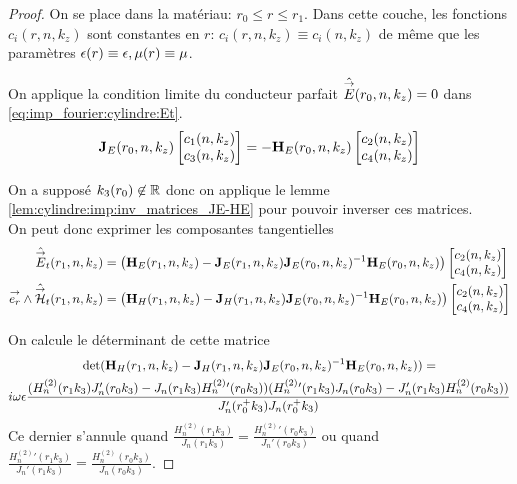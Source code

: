     \begin{proof}
      On se place dans la matériau: \(r_0 \le r \le r_ 1 \). Dans cette couche, les fonctions \(c_i(r,n,k_z)\) sont constantes en \(r\): \(c_i(r,n,k_z) \equiv c_i(n,k_z)\) de même que les paramètres \(\epsilon(r)\equiv \epsilon, \mu(r)\equiv \mu\).

      On applique la condition limite du conducteur parfait \(\hat {{\overset{\rightarrow}{E}}}(r_0,n,k_z) = 0\) dans \eqref{eq:imp_fourier:cylindre:Et}.
      \begin{equation*}
        \mathbf{J}_{E}(r_0,n,k_z)
        \begin{bmatrix}
          c_1(n,k_z) \\
          c_3(n,k_z)
        \end{bmatrix}
        =-\mathbf{H}_{E}(r_0,n,k_z)
        \begin{bmatrix}
          c_2(n,k_z) \\
          c_4(n,k_z)
        \end{bmatrix}
      \end{equation*}

      On a supposé \(k_3(r_0)\not \in \mathbb R \) donc on applique le lemme \ref{lem:cylindre:imp:inv_matrices_JE-HE} pour pouvoir inverser ces matrices.\\

      On peut donc exprimer les composantes tangentielles%
      \begin{align*}
        \hat {{\overset{\rightarrow}{E}}}_t(r_1,n,k_z) &=
        \left(\mathbf{H}_{E}(r_1,n,k_z) - \mathbf{J}_{E}(r_1,n,k_z)\mathbf{J}_{E}(r_0,n,k_z)^{-1}\mathbf{H}_{E}(r_0,n,k_z)\right)
        \begin{bmatrix}
          c_2(n,k_z) \\
          c_4(n,k_z)
        \end{bmatrix}
        \\
        {\overset{\rightarrow}{e_r}}\wedge \hat {{\overset{\rightarrow}{\mathcal{H}}}}_t(r_1,n,k_z) &=
        \left(\mathbf{H}_{H}(r_1,n,k_z) - \mathbf{J}_{H}(r_1,n,k_z)\mathbf{J}_{E}(r_0,n,k_z)^{-1}\mathbf{H}_{E}(r_0,n,k_z) \right)
        \begin{bmatrix}
          c_2(n,k_z) \\
          c_4(n,k_z)
        \end{bmatrix}
      \end{align*}

      On calcule le déterminant de cette matrice 
      \begin{multline*}
        \det(\mathbf{H}_{H}(r_1,n,k_z) - \mathbf{J}_{H}(r_1,n,k_z)\mathbf{J}_{E}(r_0,n,k_z)^{-1}\mathbf{H}_{E}(r_0,n,k_z)) = \\
        i\omega\epsilon\dfrac{(H_n^{(2)}(r_1k_3)J_n'(r_0k_3)-J_n(r_1k_3)H_n^{(2)}{}'(r_0k_3))(H_n^{(2)}{}'(r_1k_3)J_n(r_0k_3)-J_n'(r_1k_3)H_n^{(2)}(r_0k_3))}{J_n'(r_0^+k_3)J_n(r_0^+k_3)}
      \end{multline*}
      Ce dernier s'annule quand \(\frac{H_n^{(2)}(r_1k_3)}{J_n(r_1k_3)} = \frac{H_n^{(2)}{}'(r_0k_3)}{J_n'(r_0k_3)}\) ou quand \(\frac{H_n^{(2)}{}'(r_1k_3)}{J_n'(r_1k_3)} = \frac{H_n^{(2)}(r_0k_3)}{J_n(r_0k_3)}\).


\end{proof}
